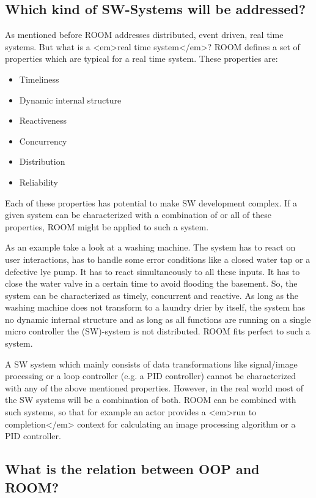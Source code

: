 \subsection{Which kind of SW-Systems will be addressed?}

As mentioned before ROOM addresses distributed, event driven, real time systems. But what is a <em>real time
system</em>? ROOM defines a set of properties which are typical for a real time system. These properties are:

\begin{itemize}
\item Timeliness
\item Dynamic internal structure
\item Reactiveness
\item Concurrency
\item Distribution
\item Reliability
\end{itemize}

Each of these properties has potential to make SW development complex. If a given system can be characterized
with a combination of or all of these properties, ROOM might be applied to such a system.  

As an example take a look at a washing machine. The system has to react on user interactions, has to handle
some error conditions like a closed water tap or a defective lye pump. It has to react simultaneously to all these inputs.
It has to close the water valve in a certain time to avoid flooding the basement. 
So, the system can be characterized as timely, concurrent and reactive. As long as the washing machine does
not transform to a laundry drier by itself, the system has no dynamic internal structure and as long as all functions
are running on a single micro controller the (SW)-system is not distributed. 
ROOM fits perfect to such a system.

A SW system which mainly consists of data transformations like signal/image processing or a loop controller
(e.g. a PID controller) cannot be characterized with any of the above mentioned properties. However, in the real
world most of the SW systems will be a combination of both. ROOM can be combined with such systems, so that for
example an actor provides a <em>run to completion</em> context for calculating an image processing algorithm or a
PID controller.  

\subsection{What is the relation between OOP and ROOM?}

